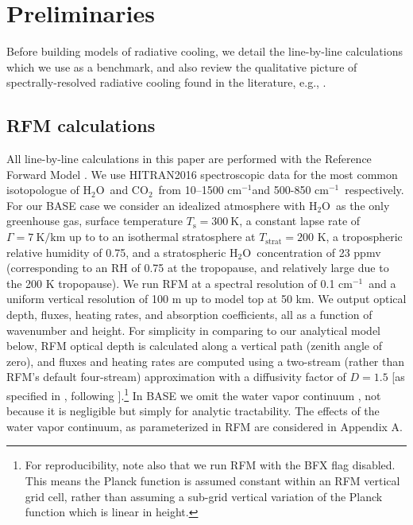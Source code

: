 \documentclass{ametsoc}
\newcommand{\Kelvin}{\ensuremath{\mathrm{K}}}
\newcommand{\km}{\ensuremath{\mathrm{km}}}
\newcommand{\cminverse}{\ensuremath{\mathrm{cm^{-1}}}}
\newcommand{\Ts}{\ensuremath{T_\mathrm{s}}}
\newcommand{\cotwo}{\ensuremath{\mathrm{CO_2}}}
\newcommand{\htwo}{\ensuremath{\mathrm{H_2O}}}
\newcommand{\Tstrat}{\ensuremath{T_{\mathrm{strat}}}}
\begin{document}
\section{Preliminaries}\label{sec_preliminaries}
Before building models of radiative cooling, we detail the line-by-line calculations which we use as a benchmark, and also review the qualitative picture of spectrally-resolved radiative cooling found in the literature, e.g., \cite{harries2008,clough1992}.

\subsection{RFM calculations} \label{sec_rfm_calcs}
All line-by-line calculations in this paper are performed with the Reference Forward Model \citep[RFM,][]{dudhia2017}. We use HITRAN2016 spectroscopic data for the most common isotopologue of \htwo\ and \cotwo\ from 10--1500 \cminverse and 500-850 \cminverse\ respectively. For our BASE case we consider an idealized atmosphere with \htwo\ as the only greenhouse gas, surface temperature $\Ts=300\ \Kelvin$,  a constant lapse rate of $\Gamma= 7\ \Kelvin/\km$ up to to an isothermal stratosphere at $\Tstrat=200$ K, a tropospheric relative humidity of 0.75, and a stratospheric \htwo\ concentration of 23 ppmv (corresponding to an RH of 0.75 at the tropopause, and relatively large due to the 200 K tropopause). We run RFM at a spectral resolution of 0.1 \cminverse\ and a uniform vertical resolution of 100 m up to model top at 50 km. We output optical depth, fluxes, heating rates, and absorption coefficients, all as a function of wavenumber and height. For simplicity in comparing to our analytical model below, RFM optical depth is calculated along a vertical path (zenith angle of zero), and fluxes and heating rates are computed using a two-stream (rather than RFM's default four-stream) approximation  with a diffusivity factor of $D=1.5$ [as specified in \cite{dudhia2017}, following \cite{clough1992}].\footnote{For reproducibility, note also that we run RFM with the BFX flag disabled. This means the Planck function is assumed constant within an  RFM vertical grid cell, rather than assuming a sub-grid vertical variation of the Planck function which is linear in height.}  In BASE  we omit the water vapor continuum \citep{shine2012}, not because it is negligible but simply for analytic tractability. The effects of the water vapor continuum, as parameterized in RFM \citep[using the MT\_CKD continuum,][]{mlawer2012} are considered in Appendix A.
\end{document}
